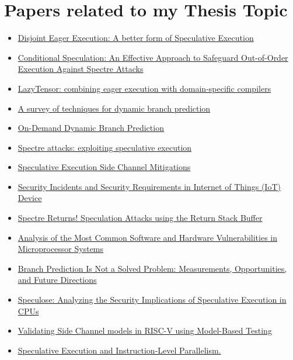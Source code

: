 \documentclass{article}
\begin{document}
\section[short]{Papers related to my Thesis Topic}
\begin{itemize}
      \item \href{https://dl.acm.org/doi/abs/10.1145/511120.511124}{Disjoint Eager Execution: A better form of Speculative Execution}
      \item \href{https://ieeexplore.ieee.org/abstract/document/8675250?casa_token=YjoisDX1IRwAAAAA:gv1daTh5EZVaBwsTjxT-RELfEqW9nSsa1EGm-3rsmnb6R29MLx-8vi9_0Ur-CMtMU2pX8zOkYSS-aA}{Conditional Speculation: An Effective Approach to Safeguard Out-of-Order Execution Against Spectre Attacks}
      \item \href{https://arxiv.org/abs/2102.13267}{LazyTensor: combining eager execution with domain-specific compilers}
      \item \href{https://onlinelibrary.wiley.com/doi/full/10.1002/cpe.4666?casa_token=qMkXDp1xwAEAAAAA%3ACaMpxxl9u_leKTAwagbxIzd30YAlxzSvOtuL94-3AvIXPzJDp_-NRJiK92sEZyp4g7UhyP5OXBmtl7E}{A survey of techniques for dynamic branch prediction}
      \item \href{https://ieeexplore.ieee.org/abstract/document/6834760?casa_token=lHuqEKUMvOkAAAAA:xveFkDrIhIB1PzLmKiQk5MmMlblFmNzSpknsgQ5LQH08IL22HRKzy78neZVXIgbcIa900BGc1CnyaA}{On-Demand Dynamic Branch Prediction}
      \item \href{https://dl.acm.org/doi/abs/10.1145/3399742}{Spectre attacks: exploiting speculative execution}
      \item \href{https://software:intel:com/sites/default/files/managed/c5/63/336996-Speculative-Execution-Side-Channel-Mitigations:pdf}{Speculative Execution Side Channel Mitigations}
      \item \href{https://www.igi-global.com/gateway/chapter/337101}{Security Incidents and Security Requirements in Internet of Things (IoT) Device}
      \item \href{https://www.usenix.org/conference/woot18/presentation/koruyeh}{Spectre Returns! Speculation Attacks using the Return Stack Buffer}
      \item \href{https://ieeexplore.ieee.org/abstract/document/9208037}{Analysis of the Most Common Software and Hardware Vulnerabilities in Microprocessor Systems}
      \item \href{https://arxiv.org/abs/1906.08170}{Branch Prediction Is Not a Solved Problem: Measurements, Opportunities, and Future Directions}
      \item \href{https://arxiv.org/abs/1801.04084}{Speculose: Analyzing the Security Implications of Speculative Execution in CPUs}
      \item \href{https://www.diva-portal.org/smash/get/diva2:1615024/FULLTEXT01.pdf}{Validating Side Channel models in RISC-V using Model-Based Testing}
      \item \href{https://citeseerx.ist.psu.edu/document?repid=rep1&type=pdf&doi=f0692dd6e23eb7cceb09ffcf5757ab645381819e}{Speculative Execution and Instruction-Level Parallelism.}
\end{itemize}
\end{document}
